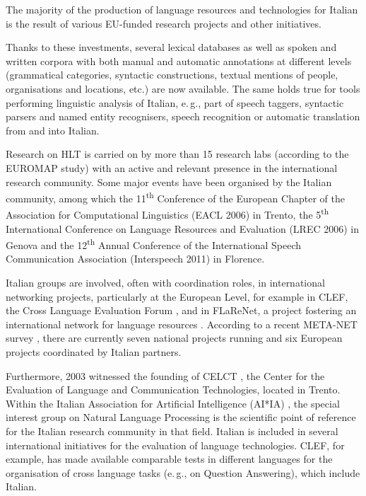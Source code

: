 \begin{multicols}{2}
The majority of the production of language resources and technologies
for Italian is the result of various EU-funded research projects and
other initiatives. 

Thanks to these investments, several lexical
databases as well as spoken and written corpora with both manual and
automatic annotations at different levels (grammatical categories,
syntactic constructions, textual mentions of people, organisations and
locations, etc.) are now available. The same holds true for tools
performing linguistic analysis of Italian, e.\,g., part of speech taggers, syntactic parsers and named entity recognisers, speech recognition or automatic translation from and into Italian.

Research on HLT is carried on by more than 15 research labs (according to the
EUROMAP study) with an active and relevant presence in the international
research community. Some major events have been organised by the Italian
community, among which the 11\textsuperscript{th} Conference of the European Chapter of the
Association for Computational Linguistics (EACL 2006) in Trento, the 5\textsuperscript{th}
International Conference on Language Resources and Evaluation (LREC 2006) in
Genova and the 12\textsuperscript{th} Annual Conference of the International Speech
Communication Association (Interspeech 2011) in Florence. 

Italian groups are involved, often with coordination roles, in international networking projects, particularly at the European Level, for example in CLEF, the Cross Language Evaluation Forum \cite{clef}, and in FLaReNet, a project fostering an international network for language resources \cite{flarenet}. According to a recent META-NET survey \cite{soria}, there are currently seven national projects running and six European projects coordinated by Italian partners.

Furthermore, 2003 witnessed the founding of CELCT \cite{celct}, the Center for the Evaluation of Language and Communication Technologies, located in Trento. Within the Italian Association for Artificial Intelligence (AI*IA) \cite{aixia}, the special interest group on Natural Language Processing is the scientific point of reference for the Italian research community in that field. Italian is included in several international initiatives for the evaluation of language technologies. CLEF, for example, has made available comparable tests in different languages for the organisation of cross language tasks (e.\,g., on Question Answering), which include Italian.


\end{multicols}
